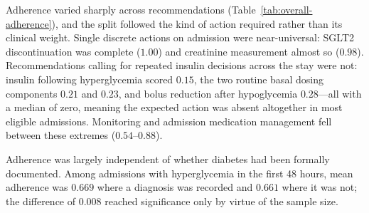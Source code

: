 Adherence varied sharply across recommendations
(Table~\ref{tab:overall-adherence}), and the split followed the kind of
action required rather than its clinical weight. Single discrete actions on
admission were near-universal: SGLT2 discontinuation was complete ($1.00$)
and creatinine measurement almost so ($0.98$). Recommendations calling for
repeated insulin decisions across the stay were not: insulin following hyperglycemia
scored $0.15$, the two routine basal dosing components $0.21$ and $0.23$,
and bolus reduction after hypoglycemia $0.28$---all with a median of zero,
meaning the expected action was absent altogether in most eligible
admissions. Monitoring and admission medication management fell between
these extremes ($0.54$--$0.88$).

Adherence was largely independent of whether diabetes had been formally
documented. Among admissions with hyperglycemia in the first 48 hours, mean
adherence was $0.669$ where a diagnosis was recorded and $0.661$ where it
was not; the difference of $0.008$ reached significance only by virtue of
the sample size.

